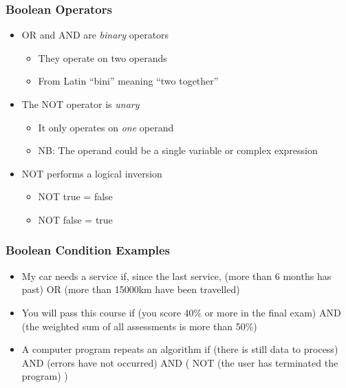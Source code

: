 \documentclass[14pt]{beamer}
\begin{document}
\begin{frame} %
\frametitle{Boolean Operators}
\begin{itemize}
\item OR and AND are \textit{binary} operators
	\begin{itemize}
		\item They operate on two operands
		\item From Latin ``bini'' meaning ``two together''
	\end{itemize}
\item The NOT operator is \textit{unary}
	\begin{itemize}
		\item It only operates on \textit{one} operand
		\item NB: The operand could be a single variable or complex expression
	\end{itemize}
\item NOT performs a logical inversion
	\begin{itemize}
		\item NOT true = false
		\item NOT false = true
	\end{itemize}
\end{itemize}
\end{frame}

\begin{frame} %
\frametitle{Boolean Condition Examples}

\begin{itemize}
	\item My car needs a service if, since the last service, (more than 6 months has past) OR (more than 15000km have been travelled)
	\item You will pass this course if (you score 40\% or more in the final exam) AND (the weighted sum of all assessments is more than 50\%)
	\item A computer program repeats an algorithm if (there is still data to process) AND (errors have not occurred) AND ( NOT (the user has terminated the program) )
\end{itemize}
\end{frame}
\end{document}
